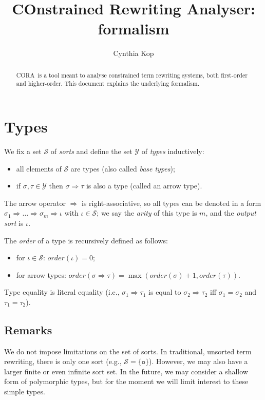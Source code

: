 \documentclass{lmcs}
\theoremstyle{theorem}\newtheorem{theorem}{Theorem}
\theoremstyle{theorem}\newtheorem{lemma}[theorem]{Lemma}
\theoremstyle{theorem}\newtheorem{corollary}[theorem]{Corollary}
\theoremstyle{definition}\newtheorem{definition}[theorem]{Definition}
\theoremstyle{definition}\newtheorem{example}[theorem]{Example}
\newcommand{\Sorts}{\mathcal{S}}
\newcommand{\Types}{\mathcal{Y}}
\newcommand{\order}{\mathit{order}}
\newcommand{\asort}{\iota}
\newcommand{\atype}{\sigma}
\newcommand{\btype}{\tau}
\newcommand{\arrtype}{\Rightarrow}
\newcommand{\unitsort}{\mathtt{o}}
\newcommand{\cora}{\textsf{CORA}\xspace}
\begin{document}
\title{COnstrained Rewriting Analyser: formalism}
\author{Cynthia Kop}
\address{Department of Software Science, Radboud University Nijmegen}

\maketitle

\begin{abstract}
\cora\ is a tool meant to analyse constrained term rewriting systems, both
first-order and higher-order.  This document explains the underlying formalism.
\end{abstract}

\section{Types}

We fix a set $\Sorts$ of \emph{sorts} and define the set $\Types$ of \emph{types} inductively:
\begin{itemize}
\item all elements of $\Sorts$ are types (also called \emph{base types});
\item if $\atype,\btype \in \Types$ then $\atype \arrtype \btype$ is also a type (called an arrow
  type).
\end{itemize}
The arrow operator $\arrtype$ is right-associative, so all types can be denoted in a form
$\atype_1 \arrtype \dots \arrtype \atype_m \arrtype \asort$ with $\asort \in \Sorts$; we say the
\emph{arity} of this type is $m$, and the \emph{output sort} is $\asort$.

The \emph{order} of a type is recursively defined as follows:
\begin{itemize}
\item for $\asort \in \Sorts$: $\order(\asort) = 0$;
\item for arrow types: $\order(\atype \arrtype \btype) = \max(\order(\atype) + 1,\order(\btype))$.
\end{itemize}

\bigskip
Type equality is literal equality (i.e., $\atype_1 \arrtype \btype_1$ is equal to $\atype_2 \arrtype
\btype_2$ iff $\atype_1 = \atype_2$ and $\btype_1 = \btype_2$).

\subsection*{Remarks}

We do not impose limitations on the set of sorts.  In traditional, unsorted term rewriting, there
is only one sort (e.g., $\Sorts = \{ \unitsort \}$). However, we may also have a larger finite or
even infinite sort set.
In the future, we may consider a shallow form of polymorphic types, but for the moment we will limit
interest to these simple types.
\end{document}
